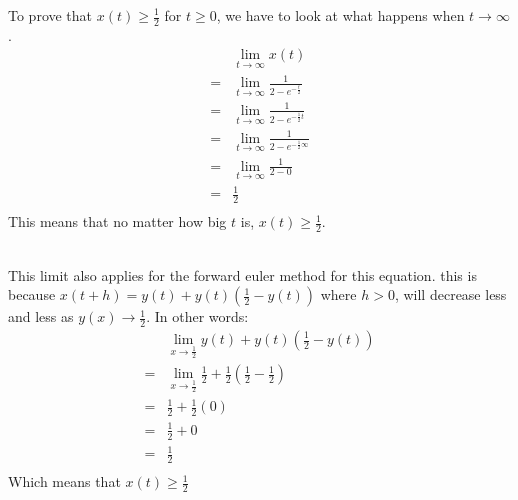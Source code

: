 \documentclass{article}
\begin{document}
To prove that $x(t) \ge \frac{1}{2}$ for $t \ge 0$, we have to look at what happens when $t \rightarrow \infty$.
\begin{equation}
    \begin{split}
        &\lim_{t \rightarrow \infty} x(t) \\
        = &\lim_{t \rightarrow \infty} \frac{1}{2 - e^{- \frac{t}{2}}} \\
        = &\lim_{t \rightarrow \infty} \frac{1}{2 - e^{- \frac{1}{2}t}} \\
        = &\lim_{t \rightarrow \infty} \frac{1}{2 - e^{- \frac{1}{2}\infty}} \\
        = &\lim_{t \rightarrow \infty} \frac{1}{2 - 0} \\
        = &\frac{1}{2} \\
    \end{split}
\end{equation}
This means that no matter how big $t$ is, $x(t) \ge \frac{1}{2}$. \\ \\

\newpage

This limit also applies for the forward euler method for this equation. this is because $x(t + h) = y(t) + y(t)(\frac{1}{2} - y(t))$ where $h > 0$,
will decrease less and less as $y(x) \rightarrow \frac{1}{2}$. In other words:
\begin{equation}
    \begin{split}
        &\lim_{x \rightarrow \frac{1}{2}}  y(t) + y(t)(\frac{1}{2} - y(t)) \\
        = &\lim_{x \rightarrow \frac{1}{2}}  \frac{1}{2} + \frac{1}{2}(\frac{1}{2} - \frac{1}{2}) \\
        = &\frac{1}{2} + \frac{1}{2}(0) \\
        = &\frac{1}{2} + 0 \\
        = &\frac{1}{2} \\
    \end{split}
\end{equation}
Which means that $x(t) \ge \frac{1}{2}$
\end{document}
